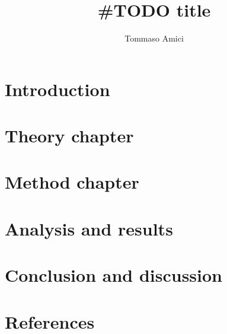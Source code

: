 \documentclass[12pt]{article}
\title{\#TODO title}
\author{Tommaso Amici}
\begin{document}
\doublespacing
{}
\maketitle
\newpage

\tableofcontents
\listoffigures
\listoftables
\newpage

\section{Introduction}
\section{Theory chapter}
\section{Method chapter}
\section{Analysis and results}
\section{Conclusion and discussion}


\section{References}
\printbibliography[heading=none]
\end{document}
